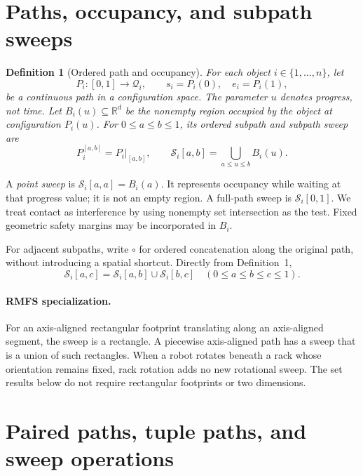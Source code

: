\documentclass[11pt,a4paper]{article}
\newtheorem{definition}{Definition}
\theoremstyle{remark}
\newcommand{\Sweep}{\mathcal S}
\begin{document}
\section{Paths, occupancy, and subpath sweeps}

\begin{definition}[Ordered path and occupancy]
For each object $i\in\{1,\ldots,n\}$, let
\begin{equation}
 P_i:[0,1]\longrightarrow\mathcal Q_i,
 \qquad s_i=P_i(0),\quad e_i=P_i(1),
 \label{eq:path}
\end{equation}
be a continuous path in a configuration space. The parameter $u$ denotes
\emph{progress, not time}. Let $B_i(u)\subseteq\mathbb R^d$ be the nonempty
region occupied by the object at configuration $P_i(u)$.
For $0\le a\le b\le1$, its ordered subpath and subpath sweep are
\begin{equation}
 P_i^{[a,b]}=P_i|_{[a,b]},\qquad
 \Sweep_i[a,b]=\bigcup_{a\le u\le b}B_i(u).
 \label{eq:sweep}
\end{equation}
\end{definition}

A \emph{point sweep} is $\Sweep_i[a,a]=B_i(a)$. It represents occupancy while
waiting at that progress value; it is not an empty region. A full-path sweep
is $\Sweep_i[0,1]$. We treat contact as interference by using nonempty set
intersection as the test. Fixed geometric safety margins may be incorporated
in $B_i$.

For adjacent subpaths, write $\circ$ for ordered concatenation along the
original path, without introducing a spatial shortcut. Directly from
Definition~1,
\begin{equation}
 \Sweep_i[a,c]=\Sweep_i[a,b]\cup\Sweep_i[b,c]
 \quad(0\le a\le b\le c\le1).
 \label{eq:union}
\end{equation}

\paragraph{RMFS specialization.}
For an axis-aligned rectangular footprint translating along an axis-aligned
segment, the sweep is a rectangle. A piecewise axis-aligned path has a sweep
that is a union of such rectangles. When a robot rotates beneath a rack whose
orientation remains fixed, rack rotation adds no new rotational sweep.
The set results below do not require rectangular footprints or two dimensions.

\section{Paired paths, tuple paths, and sweep operations}
\end{document}
